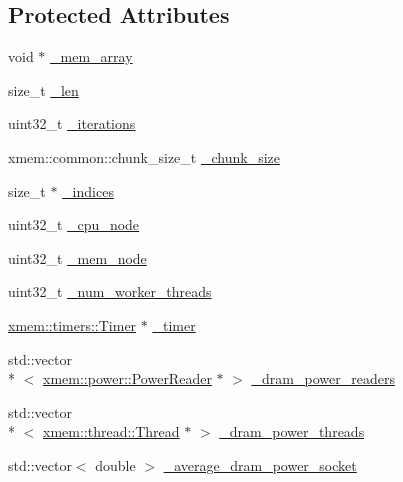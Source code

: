 \subsection*{Protected Attributes}
\begin{DoxyCompactItemize}
\item 
void $\ast$ \hyperlink{classxmem_1_1benchmark_1_1_benchmark_a134705051be06902b276f5c21d435ed0}{\-\_\-mem\-\_\-array}
\item 
size\-\_\-t \hyperlink{classxmem_1_1benchmark_1_1_benchmark_ae97857f36cabdbe76eb00142835f7881}{\-\_\-len}
\item 
uint32\-\_\-t \hyperlink{classxmem_1_1benchmark_1_1_benchmark_a968403a473a3a4f713f4e73aa0757727}{\-\_\-iterations}
\item 
xmem\-::common\-::chunk\-\_\-size\-\_\-t \hyperlink{classxmem_1_1benchmark_1_1_benchmark_ae01156a2db05a6e3f7928a7433688f56}{\-\_\-chunk\-\_\-size}
\item 
size\-\_\-t $\ast$ \hyperlink{classxmem_1_1benchmark_1_1_benchmark_a1001cb321d8d655a71d435f5a06fdd3a}{\-\_\-indices}
\item 
uint32\-\_\-t \hyperlink{classxmem_1_1benchmark_1_1_benchmark_ab840cb1f53439eeeb6bdce7cd1eed78b}{\-\_\-cpu\-\_\-node}
\item 
uint32\-\_\-t \hyperlink{classxmem_1_1benchmark_1_1_benchmark_a8489553bc6539a9b19db72e9f6ca9a9e}{\-\_\-mem\-\_\-node}
\item 
uint32\-\_\-t \hyperlink{classxmem_1_1benchmark_1_1_benchmark_acb55cafc77a1b53ea9910d1be4306970}{\-\_\-num\-\_\-worker\-\_\-threads}
\item 
\hyperlink{classxmem_1_1timers_1_1_timer}{xmem\-::timers\-::\-Timer} $\ast$ \hyperlink{classxmem_1_1benchmark_1_1_benchmark_a673c700cb58ec0bc922f36d95dab12c9}{\-\_\-timer}
\item 
std\-::vector\\*
$<$ \hyperlink{classxmem_1_1power_1_1_power_reader}{xmem\-::power\-::\-Power\-Reader} $\ast$ $>$ \hyperlink{classxmem_1_1benchmark_1_1_benchmark_a6d4445364d9b6f17ec78be6c8cf253f1}{\-\_\-dram\-\_\-power\-\_\-readers}
\item 
std\-::vector\\*
$<$ \hyperlink{classxmem_1_1thread_1_1_thread}{xmem\-::thread\-::\-Thread} $\ast$ $>$ \hyperlink{classxmem_1_1benchmark_1_1_benchmark_a7aa95682a12f8fe4262b1fffb088d6ac}{\-\_\-dram\-\_\-power\-\_\-threads}
\item 
std\-::vector$<$ double $>$ \hyperlink{classxmem_1_1benchmark_1_1_benchmark_a179b20d5ac798c140650aa82e3658273}{\-\_\-average\-\_\-dram\-\_\-power\-\_\-socket}

\end{DoxyCompactItemize}
